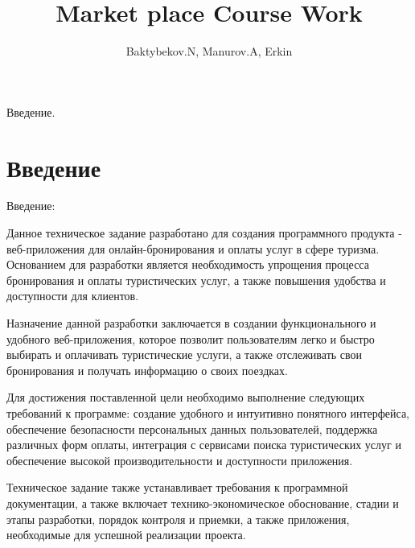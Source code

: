 
\title{Market place Course Work}

\author{Baktybekov.N, Manurov.A, Erkin}



\maketitle

\newpage
\tableofcontents{}
\setcounter{page}{1}

\newpage
{}

Введение.

\section*{Введение}


Введение:

Данное техническое задание разработано для создания программного продукта - веб-приложения для онлайн-бронирования и оплаты услуг в сфере туризма. Основанием для разработки является необходимость упрощения процесса бронирования и оплаты туристических услуг, а также повышения удобства и доступности для клиентов.

Назначение данной разработки заключается в создании функционального и удобного веб-приложения, которое позволит пользователям легко и быстро выбирать и оплачивать туристические услуги, а также отслеживать свои бронирования и получать информацию о своих поездках.

Для достижения поставленной цели необходимо выполнение следующих требований к программе: создание удобного и интуитивно понятного интерфейса, обеспечение безопасности персональных данных пользователей, поддержка различных форм оплаты, интеграция с сервисами поиска туристических услуг и обеспечение высокой производительности и доступности приложения.

Техническое задание также устанавливает требования к программной документации, а также включает технико-экономическое обоснование, стадии и этапы разработки, порядок контроля и приемки, а также приложения, необходимые для успешной реализации проекта.









